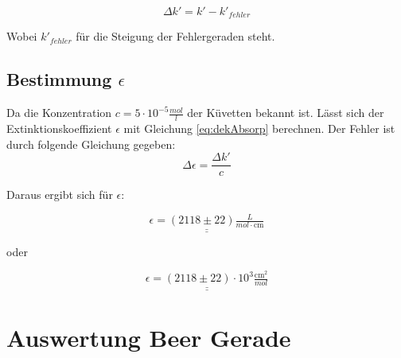 \begin{equation}
    \Delta k' = k' - k'_{fehler}
\end{equation}

Wobei $k'_{fehler}$ für die Steigung der Fehlergeraden steht.

\subsection{Bestimmung $\epsilon$}

Da die Konzentration $c = 5 \cdot 10^{-5} \tfrac{mol}{l}$ der Küvetten bekannt ist.
Lässt sich der Extinktionskoeffizient $\epsilon$ mit Gleichung \ref{eq:dekAbsorp} berechnen. Der Fehler ist durch folgende Gleichung gegeben:
\begin{equation}
    \Delta \epsilon = \frac{\Delta k'}{c}
\end{equation}

Daraus ergibt sich für $\epsilon$:

\[ \underline{\underline{\epsilon = (2118 \pm 22) \tfrac{L}{mol \cdot \text{cm}}}}\]

oder


\[ \underline{\underline{\epsilon =( 2118 \pm 22) \cdot 10^3\tfrac{\text{cm}^2}{mol}}}\]

\section{Auswertung Beer Gerade}

